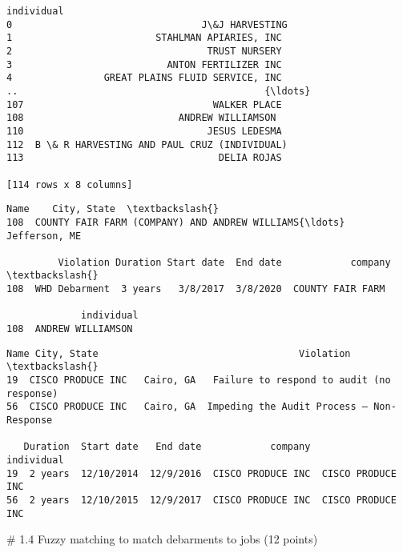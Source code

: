 \documentclass[11pt]{article}
\makeatletter
\newcommand{\boxspacing}{\kern\kvtcb@left@rule\kern\kvtcb@boxsep}
\newcommand{\prompt}[4]{
        {\ttfamily\llap{{\color{#2}[#3]:\hspace{3pt}#4}}\vspace{-\baselineskip}}
    }
\makeatother
\begin{document}
\begin{tcolorbox}[breakable, size=fbox, boxrule=.5pt, pad at break*=1mm, opacityfill=0]
\begin{Verbatim}[commandchars=\\\{\}]
                                      individual
0                                 J\&J HARVESTING
1                         STAHLMAN APIARIES, INC
2                                  TRUST NURSERY
3                           ANTON FERTILIZER INC
4                GREAT PLAINS FLUID SERVICE, INC
..                                           {\ldots}
107                                 WALKER PLACE
108                           ANDREW WILLIAMSON
110                                JESUS LEDESMA
112  B \& R HARVESTING AND PAUL CRUZ (INDIVIDUAL)
113                                  DELIA ROJAS

[114 rows x 8 columns]
\end{Verbatim}
\end{tcolorbox}
        
            \begin{tcolorbox}[breakable, size=fbox, boxrule=.5pt, pad at break*=1mm, opacityfill=0]
\prompt{Out}{outcolor}{172}{\boxspacing}
\begin{Verbatim}[commandchars=\\\{\}]
                                                  Name    City, State  \textbackslash{}
108  COUNTY FAIR FARM (COMPANY) AND ANDREW WILLIAMS{\ldots}  Jefferson, ME

         Violation Duration Start date  End date            company  \textbackslash{}
108  WHD Debarment  3 years   3/8/2017  3/8/2020  COUNTY FAIR FARM

             individual
108  ANDREW WILLIAMSON
\end{Verbatim}
\end{tcolorbox}
        
            \begin{tcolorbox}[breakable, size=fbox, boxrule=.5pt, pad at break*=1mm, opacityfill=0]
\prompt{Out}{outcolor}{172}{\boxspacing}
\begin{Verbatim}[commandchars=\\\{\}]
                 Name City, State                                   Violation  \textbackslash{}
19  CISCO PRODUCE INC   Cairo, GA   Failure to respond to audit (no response)
56  CISCO PRODUCE INC   Cairo, GA  Impeding the Audit Process – Non- Response

   Duration  Start date   End date            company         individual
19  2 years  12/10/2014  12/9/2016  CISCO PRODUCE INC  CISCO PRODUCE INC
56  2 years  12/10/2015  12/9/2017  CISCO PRODUCE INC  CISCO PRODUCE INC
\end{Verbatim}
\end{tcolorbox}
        # 1.4 Fuzzy matching to match debarments to jobs (12 points)
\end{document}
